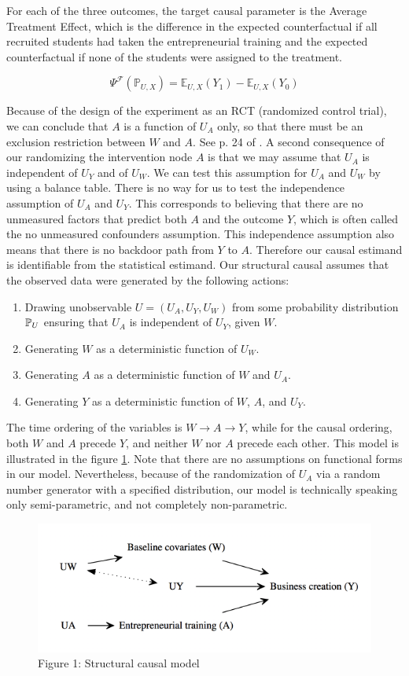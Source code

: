 For each of the three outcomes, the target causal parameter is the Average Treatment Effect, which is the difference in the expected counterfactual if all recruited students had taken the entrepreneurial training and the expected counterfactual if none of the students were assigned to the treatment.

\[ \Psi^{\mathcal{F}}(\mathbb{P}_{U,X}) = \mathbb{E}_{U,X}(Y_1) - \mathbb{E}_{U,X}(Y_0)  \]

Because of the design of the experiment as an RCT (randomized control trial), we can conclude that $A$ is a function of $U_A$ only, so that there must be an exclusion restriction between $W$ and $A$. See p. 24 of \cite{tlb}. A second consequence of our randomizing the intervention node $A$ is that we may assume that $U_A$ is independent of $U_Y$ and of $U_W$. We can test this assumption for $U_A$ and $U_W$ by using a balance table. There is no way for us to test the independence assumption of $U_A$ and $U_Y$. This corresponds to believing that there are no unmeasured factors that predict both $A$ and the outcome $Y$, which is often called the no unmeasured confounders assumption. This independence assumption also means that there is no backdoor path from $Y$ to $A$. Therefore our causal estimand is identifiable from the statistical estimand. Our structural causal assumes that the observed data were generated by the following actions: \\

\begin{enumerate}
\item Drawing unobservable $U=(U_A, U_Y, U_W)$ from some probability distribution $\mathbb{P}_U$ ensuring that $U_A$ is independent of $U_Y$, given $W$.
\item Generating $W$ as a deterministic function of $U_W$.
\item Generating $A$ as a deterministic function of $W$ and $U_A$.
\item Generating $Y$ as a deterministic function of $W$, $A$, and $U_Y$.
\end{enumerate} 

The time ordering of the variables is $W \to A \to Y$, while for the causal ordering, both $W$ and $A$ precede $Y$, and neither $W$ nor $A$ precede each other. This model is illustrated in the figure \ref{fig:DAG}. Note that there are no assumptions on functional forms in our model. Nevertheless, because of the randomization of $U_A$ via a random number generator with a specified distribution, our model is technically speaking only semi-parametric, and not completely non-parametric.\\

\begin{figure}[h]
  \centering
  \includegraphics{../../DAG_Uganda.png}
  \caption{Figure 1: Structural causal model\label{fig:DAG}}
\end{figure}


